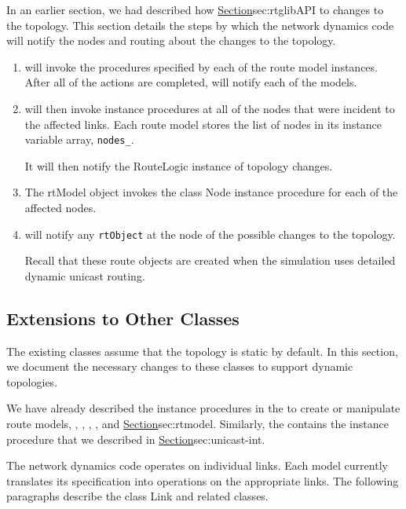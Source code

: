 In an earlier section,
we had described how
\href{unicast routing reacts}{Section}{sec:rtglibAPI}
to changes to the topology.
This section details the steps by which 
the network dynamics code will notify the nodes and routing
about the changes to the topology.
\begin{enumerate}
\item {} will invoke the procedures
  specified by each of the route model instances.
  After all of the actions are completed,
   will notify each of the models.
\item
  will then invoke instance procedures at all of the nodes
  that were incident to the affected links.
  Each route model stores the list of nodes in its instance variable
  array, {\tt nodes\_}.

  It will then notify the RouteLogic instance of topology changes.
\item
  The rtModel object invokes the class Node instance procedure
  for each of the affected nodes.
\item
   will notify any {\tt rtObject}
  at the node of the possible changes to the topology.

  Recall that these route objects are created when the simulation uses
  detailed dynamic unicast routing.
\end{enumerate}

\subsection{Extensions to Other Classes}
\label{sec:nd-extensions}

The existing classes assume that the topology is static by default.
In this section, we document the necessary changes to these
classes to support dynamic topologies.

We have already described the instance procedures
in the  to create or manipulate
route models, \ie,
, , , and
 \href{in earlier sections}{Section}{sec:rtmodel}.
Similarly, the 
contains the instance procedure 
that we described in \href{the previous section}{Section}{sec:unicast-int}.

The network dynamics code operates on individual links.
Each model currently translates its specification into
operations on the appropriate links.
The following paragraphs describe the class Link and related classes.

